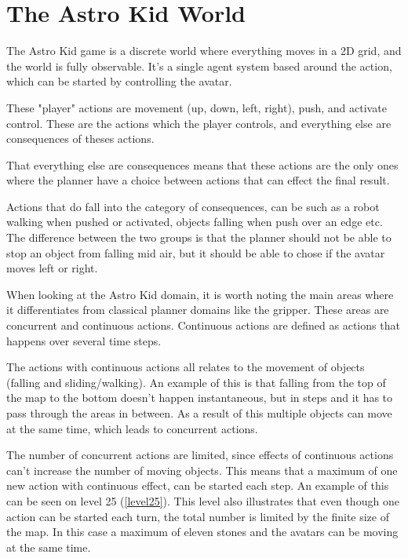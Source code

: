 	\chapter{The Astro Kid World}
	The Astro Kid game is a discrete world where everything moves in a 2D grid, and the world is fully observable. It's a single agent system based around the action, which can be started by controlling the avatar. %

	These "player" actions are movement (up, down, left, right), push, and activate control. These are the actions which the player controls, and everything else are consequences of theses actions. 

	That everything else are consequences means that these actions are the only ones where the planner have a choice between actions that can effect the final result. 
	
	
	Actions that do fall into the category of consequences, can be such as a robot walking when pushed or activated, objects falling when push over an edge etc. The difference between the two groups is that the planner should not be able to stop an object from falling mid air, but it should be able to chose if the avatar moves left or right. 
	

	When looking at the Astro Kid domain, it is worth noting the main areas where it differentiates from classical planner domains like the gripper. These areas are concurrent and continuous actions. Continuous actions are defined as actions that happens over several time steps. 

	The actions with continuous actions all relates to the movement of objects (falling and sliding/walking). An example of this is that falling from the top of the map to the bottom doesn't happen instantaneous, but in steps and it has to pass through the areas in between. As a result of this multiple objects can move at the same time, which leads to concurrent actions.
	
	The number of concurrent actions are limited, since effects of continuous actions can't increase the number of moving objects. This means that a maximum of one new action with continuous effect, can be started each step. An example of this can be seen on level 25 (\ref{level25}). This level also illustrates that even though one action can be started each turn, the total number is limited by the finite size of the map. In this case a maximum of eleven stones and the avatars can be moving at the same time.

